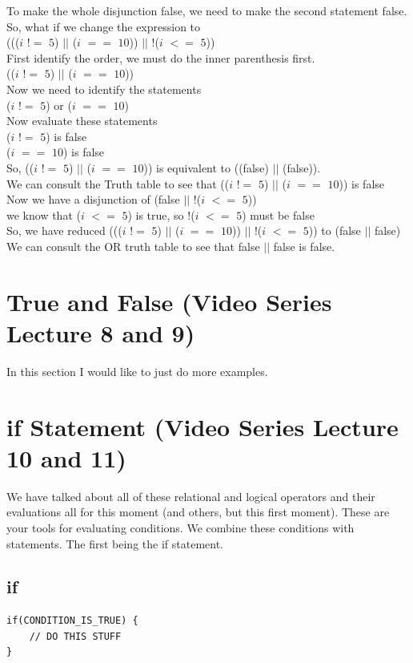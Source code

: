 \documentclass[11]{article}
\begin{document}
 To make the whole disjunction false, we need to make the second statement false. So, what if we change the expression to \\
 ((($i$ $!=$ $5$) $||$ ($i$ $==$ $10$)) $||$ !($i$ $<=$ $5$))\\
 
 First identify the order, we must do the inner parenthesis first.\\
(($i$ $!=$ $5$) $||$ ($i$ $==$ $10$))\\
Now we need to identify the statements\\
($i$ $!=$ $5$) or ($i$ $==$ $10$) \\
Now evaluate these statements \\
($i$ $!=$ $5$) is false\\
 ($i$ $==$ $10$) is false \\
 So, (($i$ $!=$ $5$) $||$ ($i$ $==$ $10$)) is equivalent to ((false) $||$ (false)).\\
 We can consult the Truth table to see that (($i$ $!=$ $5$) $||$ ($i$ $==$ $10$)) is false\\
 
 Now we have a disjunction of (false $||$ !($i$ $<=$ $5$))\\
 we know that ($i$ $<=$ $5$) is true, so   !($i$ $<=$ $5$) must be false\\
 So, we have reduced ((($i$ $!=$ $5$) $||$ ($i$ $==$ $10$)) $||$ !($i$ $<=$ $5$)) to (false $||$ false)\\
 
 We can consult the OR truth table to see that false $||$ false is false.

\section{True and False (Video Series Lecture 8 and 9)}
In this section I would like to just do more examples.
\section{if Statement (Video Series Lecture 10 and 11)}
We have talked about all of these relational and logical operators and their evaluations all for this moment (and others, but this first moment). These are your tools for evaluating conditions. We combine these conditions with statements. The first being the if statement.\\
\subsection{if}
\begin{lstlisting}
if(CONDITION_IS_TRUE) {
    // DO THIS STUFF
}
\end{lstlisting}
\end{document}
